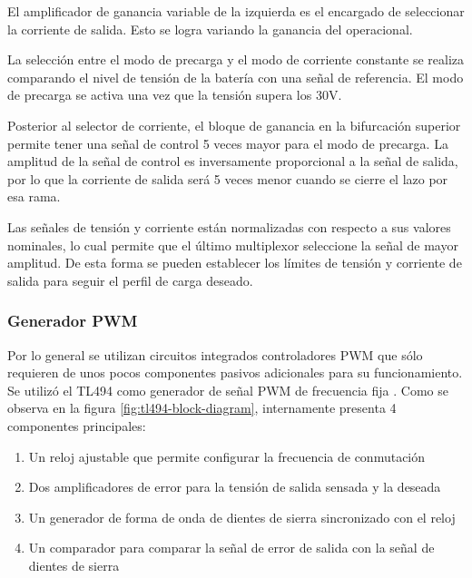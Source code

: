 El amplificador de ganancia variable de la izquierda es el encargado de seleccionar la corriente de salida.
Esto se logra variando la ganancia del operacional.

La selección entre el modo de precarga y el modo de corriente constante se realiza comparando el nivel de tensión de la batería con una señal de referencia.
El modo de precarga se activa una vez que la tensión supera los 30V.

Posterior al selector de corriente, el bloque de ganancia en la bifurcación superior permite tener una señal de control 5 veces mayor para el modo de precarga.
La amplitud de la señal de control es inversamente proporcional a la señal de salida,
por lo que la corriente de salida será 5 veces menor cuando se cierre el lazo por esa rama.

Las señales de tensión y corriente están normalizadas con respecto a sus valores nominales, lo cual permite que el último multiplexor seleccione la señal de mayor amplitud. De esta forma se pueden establecer los límites de tensión y corriente de salida para seguir el perfil de carga deseado.

\subsubsection{Generador PWM}

Por lo general se utilizan circuitos integrados controladores PWM que sólo requieren de unos pocos componentes pasivos adicionales para su funcionamiento. 
Se utilizó el TL494 como generador de señal PWM de frecuencia fija \cite{tl494}. 
Como se observa en la figura \ref{fig:tl494-block-diagram}, internamente presenta 4 componentes principales:
\begin{enumerate}
    \item Un reloj ajustable que permite configurar la frecuencia de conmutación
    \item Dos amplificadores de error para la tensión de salida sensada y la deseada
    \item Un generador de forma de onda de dientes de sierra sincronizado con el reloj
    \item Un comparador para comparar la señal de error de salida con la señal de dientes de sierra
\end{enumerate}
 
